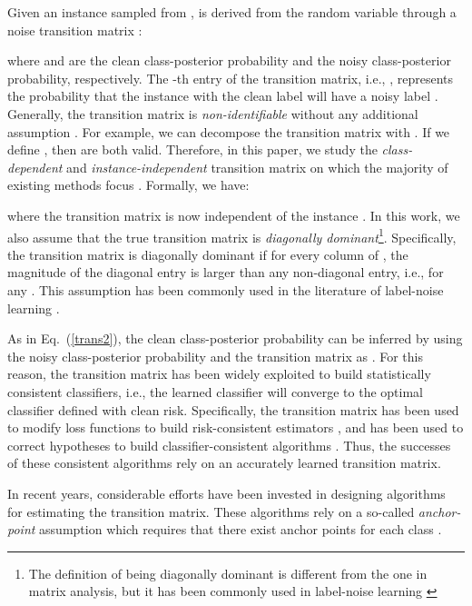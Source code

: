 \documentclass{article}
\begin{document}
Given an instance  sampled from ,  is  derived from the random variable  through a noise transition matrix :

where  and  are the clean class-posterior probability and the noisy class-posterior probability, respectively. The -th entry of the transition matrix, i.e., , represents the probability that the instance  with the clean label  will have a noisy label . Generally, the transition matrix is \textit{non-identifiable} without any additional assumption \cite{xia2019anchor}. For example, we can decompose the transition matrix with . If we define , then  are both valid. Therefore, in this paper, we study the \textit{class-dependent} and \textit{instance-independent} transition matrix on which the majority of existing methods focus \cite{han2018co,han2018masking,patrini2017making,northcuttlearning,natarajan2013learning}. Formally, we have:

where the transition matrix  is now independent of the instance . In this work, we also assume that the true transition matrix  is \textit{diagonally dominant}\footnote{The definition of being diagonally dominant is different from the one in matrix analysis, but it has been commonly used in label-noise learning \cite{xu2019l_dmi}}. Specifically, the transition matrix  is diagonally dominant if for every column of , the
magnitude of the diagonal entry is larger than any non-diagonal entry, i.e.,   for any . This assumption has been commonly used in the literature of label-noise learning \cite{patrini2017making, xia2019anchor, yao2020dual}.

As in Eq.~(\ref{trans2}), the clean class-posterior probability  can be inferred by using the noisy class-posterior probability  and the transition matrix  as . For this reason, the transition matrix has been widely exploited to build statistically consistent classifiers, i.e., the learned classifier will converge to the optimal classifier defined with clean risk. Specifically, the transition matrix has been used to modify loss functions to build risk-consistent estimators \cite{goldberger2016training, patrini2017making,yu2018learning,xia2019anchor}, and has been used to correct hypotheses to build classifier-consistent algorithms \cite{natarajan2013learning, scott2015rate, patrini2017making}. Thus, the successes of these consistent algorithms rely on an accurately learned transition matrix. 

In recent years, considerable efforts have been invested in designing algorithms for estimating the transition matrix. These algorithms rely on a so-called \textit{anchor-point} assumption which requires that there exist anchor points for each class \cite{liu2016classification,xia2019anchor}. 
\end{document}
